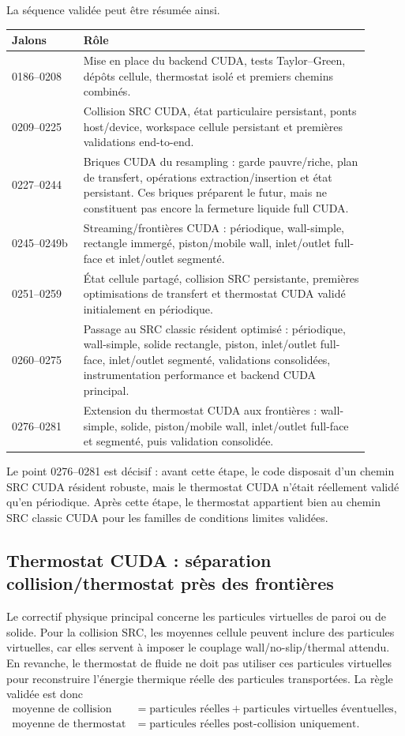 \documentclass[11pt,a4paper]{article}
\begin{document}
La séquence validée peut être résumée ainsi.
\begin{center}
\begin{tabular}{p{0.18\linewidth}p{0.72\linewidth}}
\toprule
Jalons & Rôle \\
\midrule
0186--0208 & Mise en place du backend CUDA, tests Taylor--Green, dépôts cellule, thermostat isolé et premiers chemins combinés. \\
0209--0225 & Collision SRC CUDA, état particulaire persistant, ponts host/device, workspace cellule persistant et premières validations end-to-end. \\
0227--0244 & Briques CUDA du resampling : garde pauvre/riche, plan de transfert, opérations extraction/insertion et état persistant. Ces briques préparent le futur, mais ne constituent pas encore la fermeture liquide full CUDA. \\
0245--0249b & Streaming/frontières CUDA : périodique, wall-simple, rectangle immergé, piston/mobile wall, inlet/outlet full-face et inlet/outlet segmenté. \\
0251--0259 & État cellule partagé, collision SRC persistante, premières optimisations de transfert et thermostat CUDA validé initialement en périodique. \\
0260--0275 & Passage au SRC classic résident optimisé : périodique, wall-simple, solide rectangle, piston, inlet/outlet full-face, inlet/outlet segmenté, validations consolidées, instrumentation performance et backend CUDA principal. \\
0276--0281 & Extension du thermostat CUDA aux frontières : wall-simple, solide, piston/mobile wall, inlet/outlet full-face et segmenté, puis validation consolidée. \\
\bottomrule
\end{tabular}
\end{center}

Le point 0276--0281 est décisif : avant cette étape, le code disposait d'un chemin SRC CUDA résident robuste, mais le thermostat CUDA n'était réellement validé qu'en périodique. Après cette étape, le thermostat appartient bien au chemin SRC classic CUDA pour les familles de conditions limites validées.

\subsection{Thermostat CUDA : séparation collision/thermostat près des frontières}

Le correctif physique principal concerne les particules virtuelles de paroi ou de solide. Pour la collision SRC, les moyennes cellule peuvent inclure des particules virtuelles, car elles servent à imposer le couplage wall/no-slip/thermal attendu. En revanche, le thermostat de fluide ne doit pas utiliser ces particules virtuelles pour reconstruire l'énergie thermique réelle des particules transportées. La règle validée est donc
\begin{align}
  \text{moyenne de collision} & = \text{particules réelles} + \text{particules virtuelles éventuelles}, \\
  \text{moyenne de thermostat} & = \text{particules réelles post-collision uniquement}.
\end{align}
\end{document}
